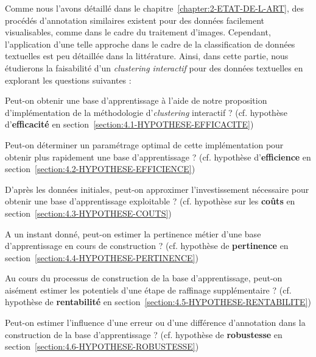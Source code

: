 	Comme nous l'avons détaillé dans le chapitre~\ref{chapter:2-ETAT-DE-L-ART}, des procédés d'annotation similaires existent pour des données facilement visualisables, comme dans le cadre du traitement d'images. Cependant, l'application d'une telle approche dans le cadre de la classification de données textuelles est peu détaillée dans la littérature. Ainsi, dans cette partie, nous étudierons la faisabilité d'un \textit{clustering interactif} pour des données textuelles en explorant les questions suivantes :
	\begin{todolist}
		\item Peut-on obtenir une base d'apprentissage à l'aide de notre proposition d'implémentation de la méthodologie d'\textit{clustering} interactif ? (cf. hypothèse d'\textbf{efficacité} en section~\ref{section:4.1-HYPOTHESE-EFFICACITE})
		\item Peut-on déterminer un paramétrage optimal de cette implémentation pour obtenir plus rapidement une base d'apprentissage ? (cf. hypothèse d'\textbf{efficience} en section~\ref{section:4.2-HYPOTHESE-EFFICIENCE})
		\item D'après les données initiales, peut-on approximer l'investissement nécessaire pour obtenir une base d'apprentissage exploitable ? (cf. hypothèse sur les \textbf{coûts} en section~\ref{section:4.3-HYPOTHESE-COUTS})
		\item A un instant donné, peut-on estimer la pertinence métier d'une base d'apprentissage en cours de construction ? (cf. hypothèse de \textbf{pertinence} en section~\ref{section:4.4-HYPOTHESE-PERTINENCE})
		\item Au cours du processus de construction de la base d'apprentissage, peut-on aisément estimer les potentiels d'une étape de raffinage supplémentaire ? (cf. hypothèse de \textbf{rentabilité} en section~\ref{section:4.5-HYPOTHESE-RENTABILITE})
		\item Peut-on estimer l'influence d'une erreur ou d'une différence d'annotation dans la construction de la base d'apprentissage ? (cf. hypothèse de \textbf{robustesse} en section~\ref{section:4.6-HYPOTHESE-ROBUSTESSE})
	\end{todolist}
	
